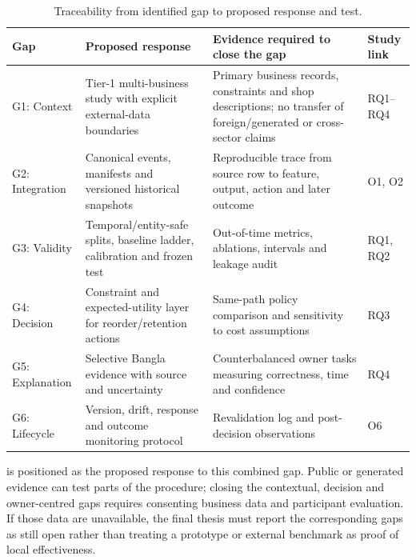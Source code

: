 \begin{table}[H]
\centering
\small
\caption{Traceability from identified gap to proposed response and test.}
\label{tab:gap_traceability}
\begin{tabularx}{\textwidth}{|p{}|p{}|Y|p{0.14\textwidth}|}
\hline
\textbf{Gap} & \textbf{Proposed response} & \textbf{Evidence required to close the gap} & \textbf{Study link} \\
\hline
G1: Context & Tier-1 multi-business study with explicit external-data boundaries & Primary business records, constraints and shop descriptions; no transfer of foreign/generated or cross-sector claims & RQ1--RQ4 \\
G2: Integration & Canonical events, manifests and versioned historical snapshots & Reproducible trace from source row to feature, output, action and later outcome & O1, O2 \\
G3: Validity & Temporal/entity-safe splits, baseline ladder, calibration and frozen test & Out-of-time metrics, ablations, intervals and leakage audit & RQ1, RQ2 \\
G4: Decision & Constraint and expected-utility layer for reorder/retention actions & Same-path policy comparison and sensitivity to cost assumptions & RQ3 \\
G5: Explanation & Selective Bangla evidence with source and uncertainty & Counterbalanced owner tasks measuring correctness, time and confidence & RQ4 \\
G6: Lifecycle & Version, drift, response and outcome monitoring protocol & Revalidation log and post-decision observations & O6 \\
\hline
\end{tabularx}
\end{table}

\system{} is positioned as the proposed response to this combined gap. Public or
generated evidence can test parts of the procedure; closing the contextual,
decision and owner-centred gaps requires consenting business data and participant
evaluation. If those data are unavailable, the final thesis must report the
corresponding gaps as still open rather than treating a prototype or external
benchmark as proof of local effectiveness.
